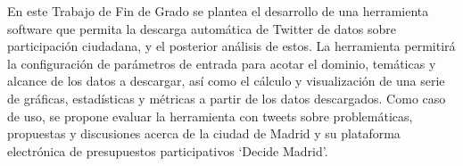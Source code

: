 En este Trabajo de Fin de Grado se plantea el desarrollo de una herramienta software que permita la descarga automática de Twitter de datos sobre participación ciudadana, y el posterior análisis de estos. La herramienta permitirá la configuración de parámetros de entrada para acotar el dominio, temáticas y alcance de los datos a descargar, así como el cálculo y visualización de una serie de gráficas, estadísticas y métricas a partir de los datos descargados. Como caso de uso, se propone evaluar la herramienta con tweets sobre problemáticas, propuestas y discusiones acerca de la ciudad de Madrid y su plataforma electrónica de presupuestos participativos ‘Decide Madrid’.